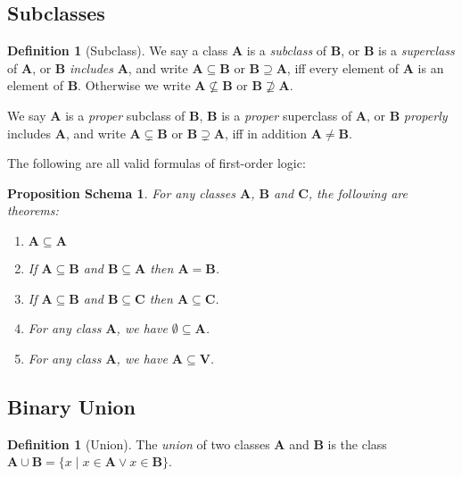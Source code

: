 \documentclass{book}
\newtheorem{props}[ax]{Proposition Schema}
\theoremstyle{definition}
\newtheorem{df}[ax]{Definition}
\begin{document}
\subsection{Subclasses}

\begin{df}[Subclass]
We say a class $\mathbf{A}$ is a \emph{subclass} of $\mathbf{B}$, or $\mathbf{B}$ is a \emph{superclass} of $\mathbf{A}$, or $\mathbf{B}$ \emph{includes} $\mathbf{A}$, and write $\mathbf{A} \subseteq \mathbf{B}$ or $\mathbf{B} \supseteq \mathbf{A}$, iff every element of $\mathbf{A}$ is an element of $\mathbf{B}$. Otherwise we write $\mathbf{A} \nsubseteq \mathbf{B}$ or $\mathbf{B} \nsupseteq \mathbf{A}$.

We say $\mathbf{A}$ is a \emph{proper} subclass of $\mathbf{B}$, $\mathbf{B}$ is a \emph{proper} superclass of $\mathbf{A}$, or $\mathbf{B}$ \emph{properly} includes $\mathbf{A}$, and write $\mathbf{A} \subsetneq \mathbf{B}$ or $\mathbf{B} \supsetneq \mathbf{A}$, iff in addition $\mathbf{A} \neq \mathbf{B}$.
\end{df}

The following are all valid formulas of first-order logic:

\begin{props}
\label{prop:subclass}
For any classes $\mathbf{A}$, $\mathbf{B}$ and $\mathbf{C}$, the following are theorems:
\begin{enumerate}
\item $\mathbf{A} \subseteq \mathbf{A}$
\item If $\mathbf{A} \subseteq \mathbf{B}$ and $\mathbf{B} \subseteq \mathbf{A}$ then $\mathbf{A} = \mathbf{B}$.
\item If $\mathbf{A} \subseteq \mathbf{B}$ and $\mathbf{B} \subseteq \mathbf{C}$ then $\mathbf{A} \subseteq \mathbf{C}$.
\item For any class $\mathbf{A}$, we have $\emptyset \subseteq \mathbf{A}$.
\item For any class $\mathbf{A}$, we have $\mathbf{A} \subseteq \mathbf{V}$.
\end{enumerate}
\end{props}

\subsection{Binary Union}

\begin{df}[Union]
The \emph{union} of two classes $\mathbf{A}$ and $\mathbf{B}$ is the class $\mathbf{A} \cup \mathbf{B} = \{x \mid x \in \mathbf{A} \vee x \in \mathbf{B} \}$.
\end{df}
\end{document}
